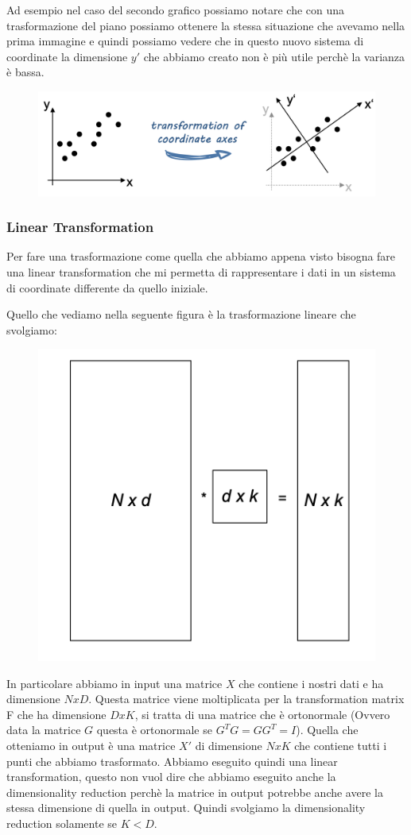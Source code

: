 \documentclass[14pt]{extreport}
\begin{document}
Ad esempio nel caso del secondo grafico possiamo notare che con una trasformazione del piano possiamo ottenere la stessa situazione
che avevamo nella prima immagine e quindi possiamo vedere che in questo nuovo sistema di coordinate la dimensione $y'$ che abbiamo creato
non è più utile perchè la varianza è bassa.

\begin{figure}[H]
\centering
\includegraphics[width=0.7\linewidth]{438.jpeg}
\end{figure}

\subsubsection{Linear Transformation}

Per fare una trasformazione come quella che abbiamo appena visto bisogna fare una linear transformation che mi permetta di 
rappresentare i dati in un sistema di coordinate differente da quello iniziale.

Quello che vediamo nella seguente figura è la trasformazione lineare che svolgiamo:

\begin{figure}[H]
	\centering
	\includegraphics[width=0.7\linewidth]{439.jpeg}
	\end{figure}

In particolare abbiamo in input una matrice $X$ che contiene i nostri dati e ha dimensione $NxD$. 
Questa matrice viene moltiplicata per la transformation matrix F che ha dimensione $DxK$, si tratta di una matrice che è ortonormale
(Ovvero data la matrice $G$ questa è ortonormale se $G^TG=GG^T=I$).
Quella che otteniamo in output è una matrice $X'$ di dimensione $NxK$ che contiene tutti i punti che abbiamo trasformato.
Abbiamo eseguito quindi una linear transformation, questo 
non vuol dire che abbiamo eseguito anche la dimensionality reduction perchè la matrice in output potrebbe anche avere la stessa 
dimensione di quella in output. Quindi svolgiamo la dimensionality reduction solamente se $K<D$.
\end{document}
